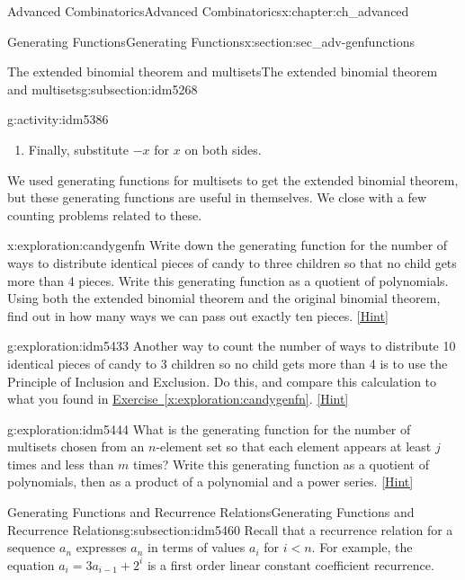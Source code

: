 \documentclass[oneside,10pt,]{book}
\numberwithin{equation}{chapter}
\newcommand{\lt}{<}
\begin{document}
\begin{chapterptx}{Advanced Combinatorics}{}{Advanced Combinatorics}{}{}{x:chapter:ch_advanced}
\begin{sectionptx}{Generating Functions}{}{Generating Functions}{}{}{x:section:sec_adv-genfunctions}
\begin{subsectionptx}{The extended binomial theorem and multisets}{}{The extended binomial theorem and multisets}{}{}{g:subsection:idm5268}
\begin{activity}{}{g:activity:idm5386}
\begin{enumerate}[font=\bfseries,label=(\alph*),ref=\alph*]
%
\item{}Finally, substitute \(-x\) for \(x\) on both sides.%
\end{enumerate}
\end{activity}
We used generating functions for multisets to get the extended binomial theorem, but these generating functions are useful in themselves.  We close with a few counting problems related to these.%
\begin{exploration}{}{x:exploration:candygenfn}%
Write down the generating function for the number of ways to distribute identical pieces of candy to three children so that no child gets more than 4 pieces. Write this generating function as a quotient of polynomials. Using both the extended binomial theorem and the original binomial theorem, find out in how many ways we can pass out exactly ten pieces.%
\space\hspace*{0pt}\hfill{\tiny\hyperlink{g:hint:idm5417-back}{[Hint]}}\end{exploration}
\begin{exploration}{}{g:exploration:idm5433}%
Another way to count the number of ways to distribute 10 identical pieces of candy to 3 children so no child gets more than 4 is to use the Principle of Inclusion and Exclusion.  Do this, and compare this calculation to what you found in \hyperref[x:exploration:candygenfn]{Exercise~\ref{x:exploration:candygenfn}}.%
\space\hspace*{0pt}\hfill{\tiny\hyperlink{g:hint:idm5437-back}{[Hint]}}\end{exploration}
\begin{exploration}{}{g:exploration:idm5444}%
What is the generating function for the number of multisets chosen from an \(n\)-element set so that each element appears at least \(j\) times and less than \(m\) times? Write this generating function as a quotient of polynomials, then as a product of a polynomial and a power series.%
\space\hspace*{0pt}\hfill{\tiny\hyperlink{g:hint:idm5450-back}{[Hint]}}\end{exploration}
\end{subsectionptx}
%
%
\typeout{************************************************}
\typeout{************************************************}
%
\begin{subsectionptx}{Generating Functions and Recurrence Relations}{}{Generating Functions and Recurrence Relations}{}{}{g:subsection:idm5460}
Recall that a recurrence relation for a sequence \(a_n\) expresses \(a_n\) in terms of values \(a_i\) for \(i\lt n\). For example, the equation \(a_i=3a_{i-1} +2^i\) is a first order linear constant coefficient recurrence.%

\end{subsectionptx}
\end{sectionptx}
\end{chapterptx}
\end{document}
